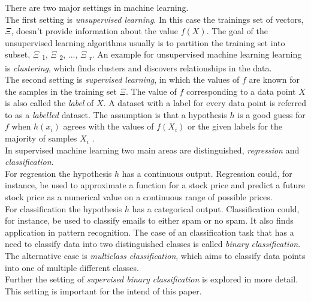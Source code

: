 There are two major settings in machine learning. 
\\
The first setting is \emph{unsupervised learning}. In this case the trainings set of vectors, $\Xi$, doesn't provide information about the value $f(X)$. The goal of the unsupervised learning algorithms usually is to partition the training set into subset, $\Xi$ \textsubscript{1}, $\Xi$ \textsubscript{2}, ..., $\Xi$ \textsubscript{r}. An example for unsupervised machine learning learning is \emph{clustering}, which finds clusters and discovers relationships in the data.
\\
The second setting is  \emph{supervised learning}, in which the values of $f$ are known for the samples in the training set $\Xi$. The value of $f$ corresponding to a data point $X$ is also called the \emph{label} of $X$. A dataset with a label for every data point is referred to as a \emph{labelled} dataset. The assumption is that a hypothesis $h$ is a good guess for $f$ when $h(x_i)$ agrees with the values of $f(X_i)$ or the given labels for the majority of samples $X_i$ .
\\
In supervised machine learning two main areas are distinguished, \emph{regression} and \emph{classification}. 
\\
For regression the hypothesis $h$ has a continuous output. Regression could, for instance, be used to approximate a function for a stock price and predict a future stock price as a numerical value on a continuous range of possible prices.
\\
For classification the hypothesis $h$ has a categorical output. Classification could, for instance, be used to classify emails to either spam or no spam. It also finds application in pattern recognition. %
The case of an classification task that has a need to classify data into two distinguished classes is called \emph{binary classification}. The alternative case is \emph{multiclass classification}, which aims to classify data points into one of multiple different classes.
\\

Further the setting of \emph{supervised binary classification} is explored in more detail. This setting is important for the intend of this paper.

